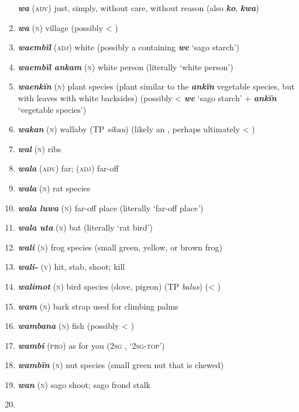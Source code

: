 \begin{enumerate}[noitemsep, label={}, align=left, widest=190, labelsep=1ex,leftmargin=*,itemindent=-10pt]
\textbf{\textit{wa}} (\textsc{adv)} just, simply, without care, without reason (also \textbf{\textit{ko}}, \textbf{\textit{kwa}}) \item 
\textbf{\textit{wa}} (\textsc{n}) village (possibly < ) \item 
\textbf{\textit{waembïl}} (\textsc{adj}) white (possibly a  containing \textbf{\textit{we}} ‘sago starch’) \item 
\textbf{\textit{waembïl ankam}} (\textsc{n}) white person (literally ‘white person’) \item 
\textbf{\textit{waenkïn}} (\textsc{n}) plant species (plant similar to the \textbf{\textit{ankïn}} vegetable species, but with leaves with white backsides) (possibly < \textbf{\textit{we}} ‘sago starch’ + \textbf{\textit{ankïn}} ‘vegetable species’) \item 
\textbf{\textit{wakan}} (\textsc{n}) wallaby (TP \textit{sikau}) (likely an , perhaps ultimately \linebreak < ) \item 
\textbf{\textit{wal}} (\textsc{n}) ribs \item 
\textbf{\textit{wala}} (\textsc{adv)} far; (\textsc{adj)} far-off \item 
\textbf{\textit{wala}} (\textsc{n}) rat species \item 
\textbf{\textit{wala luwa}} (\textsc{n}) far-off place (literally ‘far-off place’) \item 
\textbf{\textit{wala uta}} (\textsc{n}) bat (literally ‘rat bird’) \item 
\textbf{\textit{wali}} (\textsc{n}) frog species (small green, yellow, or brown frog) \item 
\textbf{\textit{wali-}} (\textsc{v}) hit, stab, shoot; kill \item 
\textbf{\textit{walimot}} (\textsc{n}) bird species (dove, pigeon) (TP \textit{balus}) (< ) \item 
\textbf{\textit{wam}} (\textsc{n}) bark strap used for climbing palms \item 
\textbf{\textit{wambana}} (\textsc{n}) fish (possibly < ) \item 
\textbf{\textit{wambi}} (\textsc{pro}) as for you (2\textsc{sg} , ‘\textsc{2sg-top}’) \item 
\textbf{\textit{wambïn}} (\textsc{n}) nut species (small green nut that is chewed) \item 
\textbf{\textit{wan}} (\textsc{n}) sago shoot; sago frond stalk \item 

\end{enumerate}
